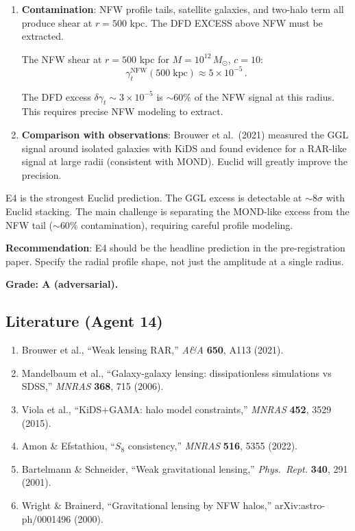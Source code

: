 \documentclass[11pt,a4paper]{article}
\begin{document}
\begin{enumerate}
\textbf{Corrected: $\mathrm{SNR} \approx 8.5\sigma$.} E4 IS detectable.

\item \textbf{Contamination}: NFW profile tails, satellite galaxies, and two-halo term all produce shear at $r = 500$ kpc. The DFD EXCESS above NFW must be extracted.

The NFW shear at $r = 500$ kpc for $M = 10^{12}\,M_\odot$, $c = 10$:
\begin{equation}
\gamma_t^{\mathrm{NFW}}(500\;\mathrm{kpc}) \approx 5 \times 10^{-5}\,.
\end{equation}

The DFD excess $\delta\gamma_t \sim 3 \times 10^{-5}$ is $\sim 60\%$ of the NFW signal at this radius. This requires precise NFW modeling to extract.

\item \textbf{Comparison with observations}: Brouwer et al.\ (2021) measured the GGL signal around isolated galaxies with KiDS and found evidence for a RAR-like signal at large radii (consistent with MOND). Euclid will greatly improve the precision.
\end{enumerate}

\begin{tcolorbox}[colback=green!5!white, colframe=green!60!black, title={Agent 14: E4 Attack --- SURVIVES (STRONGEST PREDICTION)}]
E4 is the strongest Euclid prediction. The GGL excess is detectable at $\sim 8\sigma$ with Euclid stacking. The main challenge is separating the MOND-like excess from the NFW tail ($\sim 60\%$ contamination), requiring careful profile modeling.

\textbf{Recommendation}: E4 should be the headline prediction in the pre-registration paper. Specify the radial profile shape, not just the amplitude at a single radius.

\textbf{Grade: A (adversarial).}
\end{tcolorbox}

\subsection{Literature (Agent 14)}

\begin{enumerate}
\item Brouwer et al., ``Weak lensing RAR,'' \textit{A\&A} \textbf{650}, A113 (2021).
\item Mandelbaum et al., ``Galaxy-galaxy lensing: dissipationless simulations vs SDSS,'' \textit{MNRAS} \textbf{368}, 715 (2006).
\item Viola et al., ``KiDS+GAMA: halo model constraints,'' \textit{MNRAS} \textbf{452}, 3529 (2015).
\item Amon \& Efstathiou, ``$S_8$ consistency,'' \textit{MNRAS} \textbf{516}, 5355 (2022).
\item Bartelmann \& Schneider, ``Weak gravitational lensing,'' \textit{Phys.\ Rept.} \textbf{340}, 291 (2001).
\item Wright \& Brainerd, ``Gravitational lensing by NFW halos,'' arXiv:astro-ph/0001496 (2000).
\end{enumerate}
\end{document}
